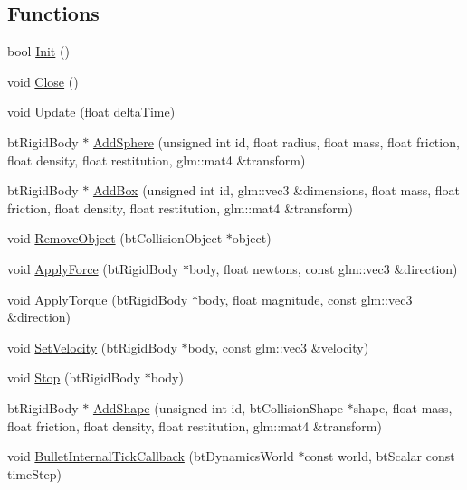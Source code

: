 \subsection*{Functions}
\begin{DoxyCompactItemize}
\item 
bool \hyperlink{namespaceTarbora_1_1PhysicsEngine_a7ec00bd287d1366ce059f2821b023634}{Init} ()
\item 
void \hyperlink{namespaceTarbora_1_1PhysicsEngine_ae7c68706207e34b87dabf53fbf6886d1}{Close} ()
\item 
void \hyperlink{namespaceTarbora_1_1PhysicsEngine_aecd7f940778147cff721cf877fefe046}{Update} (float delta\+Time)
\item 
bt\+Rigid\+Body $\ast$ \hyperlink{namespaceTarbora_1_1PhysicsEngine_a0a4d9d85104abee858af7f74dfc7213a}{Add\+Sphere} (unsigned int id, float radius, float mass, float friction, float density, float restitution, glm\+::mat4 \&transform)
\item 
bt\+Rigid\+Body $\ast$ \hyperlink{namespaceTarbora_1_1PhysicsEngine_a948faad823ce1e338a86d61c226e679e}{Add\+Box} (unsigned int id, glm\+::vec3 \&dimensions, float mass, float friction, float density, float restitution, glm\+::mat4 \&transform)
\item 
void \hyperlink{namespaceTarbora_1_1PhysicsEngine_a4debfab1c812e22ccd4f65b0b7e9cea7}{Remove\+Object} (bt\+Collision\+Object $\ast$object)
\item 
void \hyperlink{namespaceTarbora_1_1PhysicsEngine_a83b98f62953485af3b5e04d6bf4adba9}{Apply\+Force} (bt\+Rigid\+Body $\ast$body, float newtons, const glm\+::vec3 \&direction)
\item 
void \hyperlink{namespaceTarbora_1_1PhysicsEngine_a7bfaabd962f0825536195708d4442a3d}{Apply\+Torque} (bt\+Rigid\+Body $\ast$body, float magnitude, const glm\+::vec3 \&direction)
\item 
void \hyperlink{namespaceTarbora_1_1PhysicsEngine_a1c4650ee51cd6094b6faa141206a6403}{Set\+Velocity} (bt\+Rigid\+Body $\ast$body, const glm\+::vec3 \&velocity)
\item 
void \hyperlink{namespaceTarbora_1_1PhysicsEngine_aca13d6e0e807662cd096fe899c5b8776}{Stop} (bt\+Rigid\+Body $\ast$body)
\item 
bt\+Rigid\+Body $\ast$ \hyperlink{namespaceTarbora_1_1PhysicsEngine_aabb5cc7e74e00e34239fd621939e9dec}{Add\+Shape} (unsigned int id, bt\+Collision\+Shape $\ast$shape, float mass, float friction, float density, float restitution, glm\+::mat4 \&transform)
\item 
void \hyperlink{namespaceTarbora_1_1PhysicsEngine_ad4662a4ef3aac14f8a53fffc5689be89}{Bullet\+Internal\+Tick\+Callback} (bt\+Dynamics\+World $\ast$const world, bt\+Scalar const time\+Step)
\end{DoxyCompactItemize}
